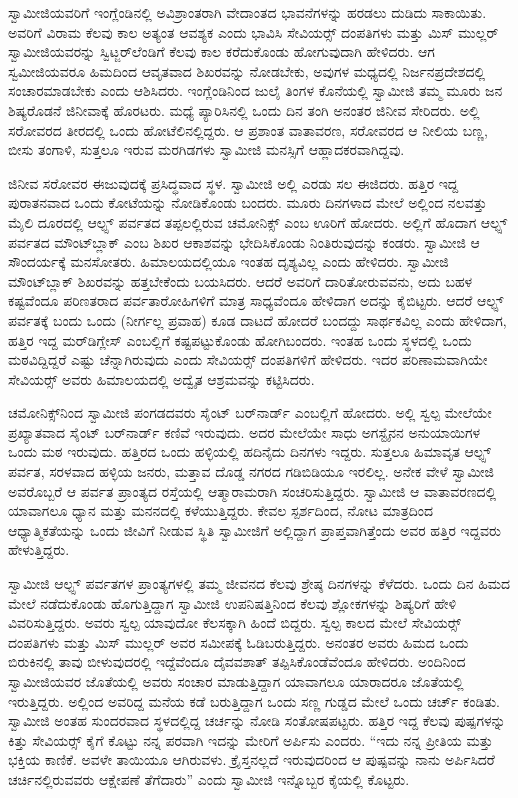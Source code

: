  ಸ್ವಾಮೀಜಿಯವರಿಗೆ ಇಂಗ್ಲೆಂಡಿನಲ್ಲಿ ಅವಿಶ್ರಾಂತರಾಗಿ ವೇದಾಂತದ ಭಾವನೆಗಳನ್ನು ಹರಡಲು ದುಡಿದು ಸಾಕಾಯಿತು. ಅವರಿಗೆ ವಿರಾಮ ಕೆಲವು ಕಾಲ ಅತ್ಯಂತ ಆವಶ್ಯಕ ಎಂದು ಭಾವಿಸಿ ಸೇವಿಯರ್ಸ್‍‍ ದಂಪತಿಗಳು ಮತ್ತು ಮಿಸ್ ಮುಲ್ಲರ್ ಸ್ವಾಮೀಜಿಯವರನ್ನು ಸ್ವಿಟ್ಜರ್‌ಲೆಂಡಿಗೆ ಕೆಲವು ಕಾಲ ಕರೆದುಕೊಂಡು ಹೋಗುವುದಾಗಿ ಹೇಳಿದರು. ಆಗ ಸ್ವಮೀಜಿಯವರೂ ಹಿಮದಿಂದ ಆವೃತವಾದ ಶಿಖರವನ್ನು ನೋಡಬೇಕು, ಅವುಗಳ ಮಧ್ಯದಲ್ಲಿ ನಿರ್ಜನಪ್ರದೇಶದಲ್ಲಿ ಸಂಚಾರಮಾಡಬೇಕು ಎಂದು ಆಶಿಸಿದರು. ಇಂಗ್ಲೆಂಡಿನಿಂದ ಜುಲೈ ತಿಂಗಳ ಕೊನೆಯಲ್ಲಿ ಸ್ವಾಮೀಜಿ ತಮ್ಮ ಮೂರು ಜನ ಶಿಷ್ಯರೊಡನೆ ಜಿನೀವಾಕ್ಕೆ ಹೊರಟರು. ಮಧ್ಯೆ ಪ್ಯಾರಿಸಿನಲ್ಲಿ ಒಂದು ದಿನ ತಂಗಿ ಅನಂತರ ಜಿನೀವ ಸೇರಿದರು. ಅಲ್ಲಿ ಸರೋವರದ ತೀರದಲ್ಲಿ ಒಂದು ಹೋಟೆಲಿನಲ್ಲಿದ್ದರು. ಆ ಪ್ರಶಾಂತ ವಾತಾವರಣ, ಸರೋವರದ ಆ ನೀಲಿಯ ಬಣ್ಣ, ಬೀಸು ತಂಗಾಳಿ, ಸುತ್ತಲೂ ಇರುವ ಮರಗಿಡಗಳು ಸ್ವಾಮೀಜಿ ಮನಸ್ಸಿಗೆ ಆಹ್ಲಾದಕರವಾಗಿದ್ದವು. 

 ಜಿನೀವ ಸರೋವರ ಈಜುವುದಕ್ಕೆ ಪ್ರಸಿದ್ಧವಾದ ಸ್ಥಳ. ಸ್ವಾಮೀಜಿ ಅಲ್ಲಿ ಎರಡು ಸಲ ಈಜಿದರು. ಹತ್ತಿರ ಇದ್ದ ಪುರಾತನವಾದ ಒಂದು ಕೋಟೆಯನ್ನು ನೋಡಿಕೊಂಡು ಬಂದರು. ಮೂರು ದಿನಗಳಾದ ಮೇಲೆ ಅಲ್ಲಿಂದ ನಲವತ್ತು ಮೈಲಿ ದೂರದಲ್ಲಿ ಆಲ್ಫ್ಸ್ ಪರ್ವತದ ತಪ್ಪಲಲ್ಲಿರುವ ಚಮೋನಿಕ್ಸ್ ಎಂಬ ಊರಿಗೆ ಹೋದರು. ಅಲ್ಲಿಗೆ ಹೊದಾಗ ಆಲ್ಫ್ಸ್ ಪರ್ವತದ ಮೌಂಟ್‍ಬ್ಲಾಕ್ ಎಂಬ ಶಿಖರ ಆಕಾಶವನ್ನು ಭೇದಿಸಿಕೊಂಡು ನಿಂತಿರುವುದನ್ನು ಕಂಡರು. ಸ್ವಾಮೀಜಿ ಆ ಸೌಂದರ್ಯಕ್ಕೆ ಮನಸೋತರು. ಹಿಮಾಲಯದಲ್ಲಿಯೂ ಇಂತಹ ದೃಶ್ಯವಿಲ್ಲ ಎಂದು ಹೇಳಿದರು. ಸ್ವಾಮೀಜಿ ಮೌಂಟ್‍ಬ್ಲಾಕ್ ಶಿಖರವನ್ನು ಹತ್ತಬೇಕೆಂದು ಬಯಸಿದರು. ಆದರೆ ಅವರಿಗೆ ದಾರಿತೋರುವವನು, ಅದು ಬಹಳ ಕಷ್ಟವೆಂದೂ ಪರಿಣತರಾದ ಪರ್ವತಾರೋಹಿಗಳಿಗೆ ಮಾತ್ರ ಸಾಧ್ಯವೆಂದೂ ಹೇಳಿದಾಗ ಅದನ್ನು ಕೈಬಿಟ್ಟರು. ಆದರೆ ಆಲ್ಫ್ಸ್ ಪರ್ವತಕ್ಕೆ ಬಂದು ಒಂದು (ನೀರ್ಗಲ್ಲ ಪ್ರವಾಹ) ಕೂಡ ದಾಟದೆ ಹೋದರೆ ಬಂದದ್ದು ಸಾರ್ಥಕವಿಲ್ಲ ಎಂದು ಹೇಳಿದಾಗ, ಹತ್ತಿರ ಇದ್ದ ಮರ್‌ಡಿಗ್ಲೇಸ್ ಎಂಬಲ್ಲಿಗೆ ಕಷ್ಟಪಟ್ಟುಕೊಂಡು ಹೋಗಿಬಂದರು. ಇಂತಹ ಒಂದು ಸ್ಥಳದಲ್ಲಿ ಒಂದು ಮಠವಿದ್ದಿದ್ದರೆ ಎಷ್ಟು ಚೆನ್ನಾಗಿರುವುದು ಎಂದು ಸೇವಿಯರ್ಸ್‍‍ ದಂಪತಿಗಳಿಗೆ ಹೇಳಿದರು. ಇದರ ಪರಿಣಾಮವಾಗಿಯೇ ಸೇವಿಯರ್ಸ್‍‍ ಅವರು ಹಿಮಾಲಯದಲ್ಲಿ ಅದ್ವೈತ ಆಶ್ರಮವನ್ನು ಕಟ್ಟಿಸಿದರು. 

 ಚಮೋನಿಕ್ಸ್‌ನಿಂದ ಸ್ವಾಮೀಜಿ ಪಂಗಡದವರು ಸೈಂಟ್ ಬರ್‌ನಾರ್ಡ್ ಎಂಬಲ್ಲಿಗೆ ಹೋದರು. ಅಲ್ಲಿ ಸ್ವಲ್ಪ ಮೇಲೆಯೇ ಪ್ರಖ್ಯಾತವಾದ ಸೈಂಟ್ ಬರ್‌ನಾರ್ಡ್ ಕಣಿವೆ ಇರುವುದು. ಅದರ ಮೇಲೆಯೇ ಸಾಧು ಅಗಸ್ಟೈನನ ಅನುಯಾಯಿಗಳ ಒಂದು ಮಠ ಇರುವುದು. ಹತ್ತಿರದ ಒಂದು ಹಳ್ಳಿಯಲ್ಲಿ ಹದಿನೈದು ದಿನಗಳು ಇದ್ದರು. ಸುತ್ತಲೂ ಹಿಮಾವೃತ ಆಲ್ಫ್ಸ್ ಪರ್ವತ, ಸರಳವಾದ ಹಳ್ಳಿಯ ಜನರು, ಮತ್ತಾವ ದೊಡ್ಡ ನಗರದ ಗಡಿಬಿಡಿಯೂ ಇರಲಿಲ್ಲ. ಅನೇಕ ವೇಳೆ ಸ್ವಾಮೀಜಿ ಅವರೊಬ್ಬರೆ ಆ ಪರ್ವತ ಪ್ರಾಂತ್ಯದ ರಸ್ತೆಯಲ್ಲಿ ಆತ್ಮಾರಾಮರಾಗಿ ಸಂಚರಿಸುತ್ತಿದ್ದರು. ಸ್ವಾಮೀಜಿ ಆ ವಾತಾವರಣದಲ್ಲಿ ಯಾವಾಗಲೂ ಧ್ಯಾನ ಮತ್ತು ಮನನದಲ್ಲಿ ಕಳೆಯುತ್ತಿದ್ದರು. ಕೇವಲ ಸ್ಪರ್ಶದಿಂದ, ನೋಟ ಮಾತ್ರದಿಂದ ಆಧ್ಯಾತ್ಮಿಕತೆಯನ್ನು ಒಂದು ಜೀವಿಗೆ ನೀಡುವ ಸ್ಥಿತಿ ಸ್ವಾಮೀಜಿಗೆ ಅಲ್ಲಿದ್ದಾಗ ಪ್ರಾಪ್ತವಾಗಿತ್ತೆಂದು ಅವರ ಹತ್ತಿರ ಇದ್ದವರು ಹೇಳುತ್ತಿದ್ದರು. 

 ಸ್ವಾಮೀಜಿ ಆಲ್ಫ್ಸ್ ಪರ್ವತಗಳ ಪ್ರಾಂತ್ಯಗಳಲ್ಲಿ ತಮ್ಮ ಜೀವನದ ಕೆಲವು ಶ್ರೇಷ್ಠ ದಿನಗಳನ್ನು ಕೆಳೆದರು. ಒಂದು ದಿನ ಹಿಮದ ಮೇಲೆ ನಡೆದುಕೊಂಡು ಹೊಗುತ್ತಿದ್ದಾಗ ಸ್ವಾಮೀಜಿ ಉಪನಿಷತ್ತಿನಿಂದ ಕೆಲವು ಶ್ಲೋಕಗಳನ್ನು ಶಿಷ್ಯರಿಗೆ ಹೇಳಿ ವಿವರಿಸುತ್ತಿದ್ದರು. ಅವರು ಸ್ವಲ್ಪ ಯಾವುದೋ ಕೆಲಸಕ್ಕಾಗಿ ಹಿಂದೆ ಬಿದ್ದರು. ಸ್ವಲ್ಪ ಕಾಲದ ಮೇಲೆ ಸೇವಿಯರ್ಸ್‍‍ ದಂಪತಿಗಳು ಮತ್ತು ಮಿಸ್ ಮುಲ್ಲರ್ ಅವರ ಸಮೀಪಕ್ಕೆ ಓಡಿಬರುತ್ತಿದ್ದರು. ಅನಂತರ ಅವರು ಹಿಮದ ಒಂದು ಬಿರುಕಿನಲ್ಲಿ ತಾವು ಬೀಳುವುದರಲ್ಲಿ ಇದ್ದೆವೆಂದೂ ದೈವವಶಾತ್ ತಪ್ಪಿಸಿಕೊಂಡೆವೆಂದೂ ಹೇಳಿದರು. ಅಂದಿನಿಂದ ಸ್ವಾಮೀಜಿಯವರ ಜೊತೆಯಲ್ಲಿ ಅವರು ಸಂಚಾರ ಮಾಡುತ್ತಿದ್ದಾಗ ಯಾವಾಗಲೂ ಯಾರಾದರೂ ಜೊತೆಯಲ್ಲಿ ಇರುತ್ತಿದ್ದರು. ಅಲ್ಲಿಂದ ಅವರಿದ್ದ ಮನೆಯ ಕಡೆ ಬರುತ್ತಿದ್ದಾಗ ಒಂದು ಸಣ್ಣ ಗುಡ್ಡದ ಮೇಲೆ ಒಂದು ಚರ್ಚ್ ಕಂಡಿತು. ಸ್ವಾಮೀಜಿ ಅಂತಹ ಸುಂದರವಾದ ಸ್ಥಳದಲ್ಲಿದ್ದ ಚರ್ಚನ್ನು ನೋಡಿ ಸಂತೋಷಪಟ್ಟರು. ಹತ್ತಿರ ಇದ್ದ ಕೆಲವು ಪುಷ್ಪಗಳನ್ನು ಕಿತ್ತು ಸೇವಿಯರ್ಸ್‍‍ ಕೈಗೆ ಕೊಟ್ಟು ನನ್ನ ಪರವಾಗಿ ಇದನ್ನು ಮೇರಿಗೆ ಅರ್ಪಿಸು ಎಂದರು. “ಇದು ನನ್ನ ಪ್ರೀತಿಯ ಮತ್ತು ಭಕ್ತಿಯ ಕಾಣಿಕೆ. ಅವಳೇ ತಾಯಿಯೂ ಆಗಿರುವಳು. ಕ್ರೈಸ್ತನಲ್ಲದೆ ಇರುವುದರಿಂದ ಆ ಪುಷ್ಪವನ್ನು ನಾನು ಅರ್ಪಿಸಿದರೆ ಚರ್ಚಿನಲ್ಲಿರುವವರು ಆಕ್ಷೇಪಣೆ ತೆಗೆದಾರು” ಎಂದು ಸ್ವಾಮೀಜಿ ಇನ್ನೊಬ್ಬರ ಕೈಯಲ್ಲಿ ಕೊಟ್ಟರು. 

